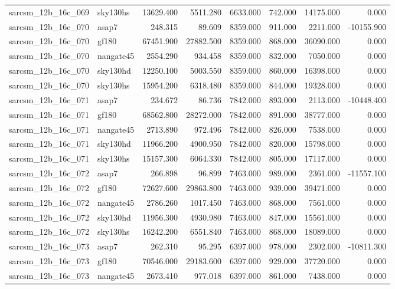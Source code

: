 \begin{tabular}{llrrrrrr}
sarcsm\_12b\_16c\_069 & sky130hs & 13629.400 & 5511.280 & 6633.000 & 742.000 & 14175.000 & 0.000 \\
sarcsm\_12b\_16c\_070 & asap7 & 248.315 & 89.609 & 8359.000 & 911.000 & 2211.000 & -10155.900 \\
sarcsm\_12b\_16c\_070 & gf180 & 67451.900 & 27882.500 & 8359.000 & 868.000 & 36090.000 & 0.000 \\
sarcsm\_12b\_16c\_070 & nangate45 & 2554.290 & 934.458 & 8359.000 & 832.000 & 7050.000 & 0.000 \\
sarcsm\_12b\_16c\_070 & sky130hd & 12250.100 & 5003.550 & 8359.000 & 860.000 & 16398.000 & 0.000 \\
sarcsm\_12b\_16c\_070 & sky130hs & 15954.200 & 6318.480 & 8359.000 & 844.000 & 19328.000 & 0.000 \\
sarcsm\_12b\_16c\_071 & asap7 & 234.672 & 86.736 & 7842.000 & 893.000 & 2113.000 & -10448.400 \\
sarcsm\_12b\_16c\_071 & gf180 & 68562.800 & 28272.000 & 7842.000 & 891.000 & 38777.000 & 0.000 \\
sarcsm\_12b\_16c\_071 & nangate45 & 2713.890 & 972.496 & 7842.000 & 826.000 & 7538.000 & 0.000 \\
sarcsm\_12b\_16c\_071 & sky130hd & 11966.200 & 4900.950 & 7842.000 & 820.000 & 15798.000 & 0.000 \\
sarcsm\_12b\_16c\_071 & sky130hs & 15157.300 & 6064.330 & 7842.000 & 805.000 & 17117.000 & 0.000 \\
sarcsm\_12b\_16c\_072 & asap7 & 266.898 & 96.899 & 7463.000 & 989.000 & 2361.000 & -11557.100 \\
sarcsm\_12b\_16c\_072 & gf180 & 72627.600 & 29863.800 & 7463.000 & 939.000 & 39471.000 & 0.000 \\
sarcsm\_12b\_16c\_072 & nangate45 & 2786.260 & 1017.450 & 7463.000 & 868.000 & 7561.000 & 0.000 \\
sarcsm\_12b\_16c\_072 & sky130hd & 11956.300 & 4930.980 & 7463.000 & 847.000 & 15561.000 & 0.000 \\
sarcsm\_12b\_16c\_072 & sky130hs & 16242.200 & 6551.840 & 7463.000 & 868.000 & 18089.000 & 0.000 \\
sarcsm\_12b\_16c\_073 & asap7 & 262.310 & 95.295 & 6397.000 & 978.000 & 2302.000 & -10811.300 \\
sarcsm\_12b\_16c\_073 & gf180 & 70546.000 & 29183.600 & 6397.000 & 929.000 & 37720.000 & 0.000 \\
sarcsm\_12b\_16c\_073 & nangate45 & 2673.410 & 977.018 & 6397.000 & 861.000 & 7438.000 & 0.000 \\

\end{tabular}
